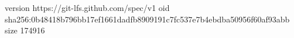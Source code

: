 version https://git-lfs.github.com/spec/v1
oid sha256:0b48418b796bb17ef1661dadfb8909191c7fc537e7b4ebdba50956f60af93abb
size 174916
